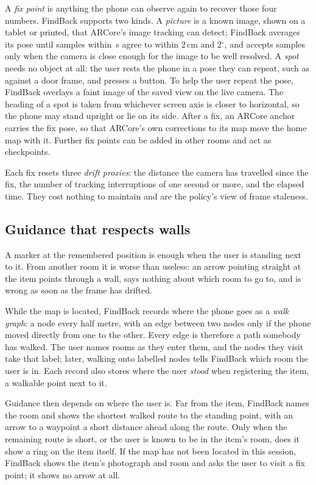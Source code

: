 \documentclass[sigconf,10pt]{acmart}
\newcommand{\sys}{FindBack}
\begin{document}
A \emph{fix point} is anything the phone can observe again to recover those four numbers.
\sys{} supports two kinds.
A \emph{picture} is a known image, shown on a tablet or printed, that ARCore's image tracking can
detect; \sys{} averages its pose until \FixAgreeSamples{} samples within \FixAgreeWindowS{}\,s
agree to within 2\,cm and 2$^\circ$, and accepts samples only when the camera is close enough for
the image to be well resolved.
A \emph{spot} needs no object at all: the user rests the phone in a pose they can repeat, such as
against a door frame, and presses a button.
To help the user repeat the pose, \sys{} overlays a faint image of the saved view on the live
camera.
The heading of a spot is taken from whichever screen axis is closer to horizontal, so the phone
may stand upright or lie on its side.
After a fix, an ARCore anchor carries the fix pose, so that ARCore's own corrections to its map
move the home map with it.
Further fix points can be added in other rooms and act as checkpoints.

Each fix resets three \emph{drift proxies}: the distance the camera has travelled since the fix,
the number of tracking interruptions of one second or more, and the elapsed time.
They cost nothing to maintain and are the policy's view of frame staleness.

\subsection{Guidance that respects walls}

A marker at the remembered position is enough when the user is standing next to it.
From another room it is worse than useless: an arrow pointing straight at the item points through
a wall, says nothing about which room to go to, and is wrong as soon as the frame has drifted.

While the map is located, \sys{} records where the phone goes as a \emph{walk graph}: a node every
half metre, with an edge between two nodes only if the phone moved directly from one to the
other.
Every edge is therefore a path somebody has walked.
The user names rooms as they enter them, and the nodes they visit take that label; later, walking
onto labelled nodes tells \sys{} which room the user is in.
Each record also stores where the user \emph{stood} when registering the item, a walkable point
next to it.

Guidance then depends on where the user is.
Far from the item, \sys{} names the room and shows the shortest walked route to the standing
point, with an arrow to a waypoint a short distance ahead along the route.
Only when the remaining route is short, or the user is known to be in the item's room, does it
show a ring on the item itself.
If the map has not been located in this session, \sys{} shows the item's photograph and room and
asks the user to visit a fix point; it shows no arrow at all.
\end{document}
